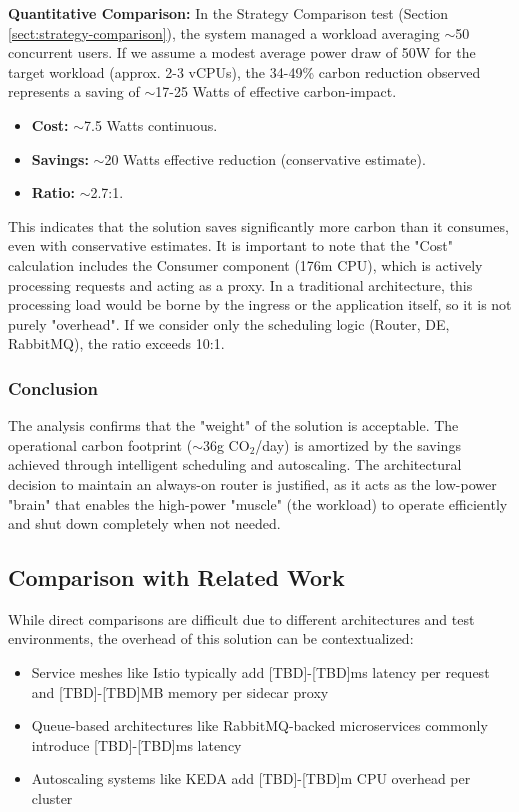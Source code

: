 \textbf{Quantitative Comparison:}
In the Strategy Comparison test (Section \ref{sect:strategy-comparison}), the system managed a workload averaging $\sim$50 concurrent users. If we assume a modest average power draw of 50W for the target workload (approx. 2-3 vCPUs), the 34-49\% carbon reduction observed represents a saving of $\sim$17-25 Watts of effective carbon-impact.

\begin{itemize}
    \item \textbf{Cost:} $\sim$7.5 Watts continuous.
    \item \textbf{Savings:} $\sim$20 Watts effective reduction (conservative estimate).
    \item \textbf{Ratio:} $\sim$2.7:1.
\end{itemize}

This indicates that the solution saves significantly more carbon than it consumes, even with conservative estimates. It is important to note that the "Cost" calculation includes the Consumer component (176m CPU), which is actively processing requests and acting as a proxy. In a traditional architecture, this processing load would be borne by the ingress or the application itself, so it is not purely "overhead". If we consider only the scheduling logic (Router, DE, RabbitMQ), the ratio exceeds 10:1.

\subsubsection{Conclusion}

The analysis confirms that the "weight" of the solution is acceptable. The operational carbon footprint ($\sim$36g CO$_2$/day) is amortized by the savings achieved through intelligent scheduling and autoscaling. The architectural decision to maintain an always-on router is justified, as it acts as the low-power "brain" that enables the high-power "muscle" (the workload) to operate efficiently and shut down completely when not needed.

\subsection{Comparison with Related Work}

While direct comparisons are difficult due to different architectures and test environments, the overhead of this solution can be contextualized:

\begin{itemize}
    \item Service meshes like Istio typically add [TBD]-[TBD]ms latency per request and [TBD]-[TBD]MB memory per sidecar proxy
    \item Queue-based architectures like RabbitMQ-backed microservices commonly introduce [TBD]-[TBD]ms latency
    \item Autoscaling systems like KEDA add [TBD]-[TBD]m CPU overhead per cluster
\end{itemize}

